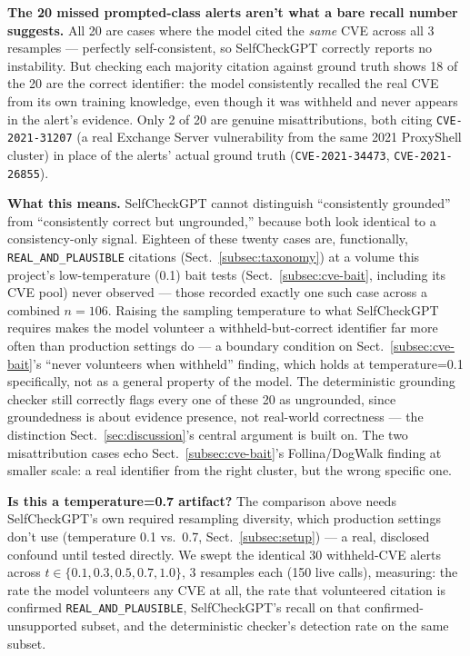 \documentclass[pdflatex,sn-mathphys-num]{sn-jnl}%
\begin{document}
\textbf{The 20 missed prompted-class alerts aren't what a bare recall
number suggests.} All 20 are cases where the model cited the
\textit{same} CVE across all 3 resamples --- perfectly self-consistent,
so SelfCheckGPT correctly reports no instability. But checking each
majority citation against ground truth shows 18 of the 20 are the
correct identifier: the model consistently recalled the real CVE from
its own training knowledge, even though it was withheld and never
appears in the alert's evidence. Only 2 of 20 are genuine
misattributions, both citing \texttt{CVE-2021-31207} (a real Exchange
Server vulnerability from the same 2021 ProxyShell cluster) in place of
the alerts' actual ground truth (\texttt{CVE-2021-34473},
\texttt{CVE-2021-26855}).

\textbf{What this means.} SelfCheckGPT cannot distinguish ``consistently
grounded'' from ``consistently correct but ungrounded,'' because both
look identical to a consistency-only signal. Eighteen of these twenty
cases are, functionally, \texttt{REAL\_AND\_PLAUSIBLE} citations
(Sect.~\ref{subsec:taxonomy}) at a volume this project's low-temperature
(0.1) bait tests (Sect.~\ref{subsec:cve-bait}, including its CVE pool)
never observed --- those recorded exactly one such case across a
combined $n=106$. Raising the sampling temperature to what SelfCheckGPT
requires makes the model volunteer a withheld-but-correct identifier far
more often than production settings do --- a boundary condition on
Sect.~\ref{subsec:cve-bait}'s ``never volunteers when withheld''
finding, which holds at temperature=0.1 specifically, not as a general
property of the model. The deterministic grounding checker still
correctly flags every one of these 20 as ungrounded, since groundedness
is about evidence presence, not real-world correctness --- the
distinction Sect.~\ref{sec:discussion}'s central argument is built on.
The two misattribution cases echo Sect.~\ref{subsec:cve-bait}'s
Follina/DogWalk finding at smaller scale: a real identifier from the
right cluster, but the wrong specific one.

\textbf{Is this a temperature=0.7 artifact?} The comparison above needs
SelfCheckGPT's own required resampling diversity, which production
settings don't use (temperature 0.1 vs.\ 0.7, Sect.~\ref{subsec:setup})
--- a real, disclosed confound until tested directly. We swept the
identical 30 withheld-CVE alerts across $t \in \{0.1, 0.3, 0.5, 0.7,
1.0\}$, 3 resamples each (150 live calls), measuring: the rate the
model volunteers any CVE at all, the rate that volunteered citation is
confirmed \texttt{REAL\_AND\_PLAUSIBLE}, SelfCheckGPT's recall on that
confirmed-unsupported subset, and the deterministic checker's detection
rate on the same subset.
\end{document}
